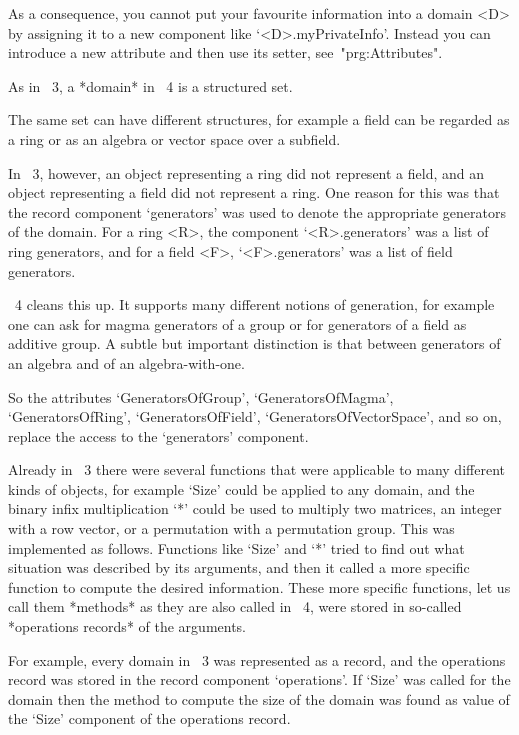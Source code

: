 As a consequence, you cannot put your favourite information into a
domain <D> by assigning it to a new component like `<D>.myPrivateInfo'.
Instead you can introduce a new attribute and then use its setter,
see~"prg:Attributes".



As in {\GAP}~3, a *domain* in {\GAP}~4 is a structured set.

The same set can have different structures, for example a field can be
regarded as a ring or as an algebra or vector space over a subfield.

In {\GAP}~3, however, an object representing a ring did not represent a
field, and an object representing a field did not represent a ring.
One reason for this was that the record component `generators' was used
to denote the appropriate generators of the domain.
For a ring <R>, the component `<R>.generators' was a list of ring
generators, and for a field <F>, `<F>.generators' was a list of field
generators.

{\GAP}~4 cleans this up.
It supports many different notions of generation,
for example one can ask for magma generators of a group
or for generators of a field as additive group.
A subtle but important distinction is that between generators of an
algebra and of an algebra-with-one.

So the attributes `GeneratorsOfGroup', `GeneratorsOfMagma',
`GeneratorsOfRing', `GeneratorsOfField', `GeneratorsOfVectorSpace',
and so on, replace the access to the `generators' component.



Already in {\GAP}~3 there were several functions that were applicable to
many different kinds of objects, for example `Size' could be applied to
any domain, and the binary infix multiplication `*' could be used to
multiply two matrices, an integer with a row vector, or a permutation
with a permutation group.
This was implemented as follows.
Functions like `Size' and `*' tried to find out what situation was
described by its arguments, and then it called a more specific function
to compute the desired information.
These more specific functions, let us call them *methods* as they are
also called in {\GAP}~4,
were stored in so-called *operations records* of the arguments.

For example, every domain in {\GAP}~3 was represented as a record, and
the operations record was stored in the record component `operations'.
If `Size' was called for the domain then the method to compute the size
of the domain was found as value of the `Size' component of the
operations record.


